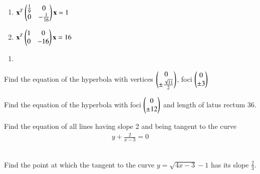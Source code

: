 \begin{enumerate}
\item 
$
\mathbf{x}^T\begin{pmatrix}\frac{1}{9} & 0 \\ 0 & -\frac{1}{16}\end{pmatrix}\mathbf{x} = 1
$
\item 
$
\mathbf{x}^T\begin{pmatrix}1 & 0 \\ 0 & -16\end{pmatrix}\mathbf{x} = 16
$
\end{enumerate}
\solution
\begin{enumerate}
    \item 
    

\end{enumerate}

\item Find the equation of the hyperbola with  vertices $\begin{pmatrix}0 \\ \pm \frac{\sqrt{11}}{2}\end{pmatrix}$, foci $\begin{pmatrix} 0\\ \pm 3\end{pmatrix}$
\item Find the equation of the hyperbola with   foci $\begin{pmatrix} 0\\ \pm 12\end{pmatrix}$ and length of latus rectum 36.
%
\item Find the equation of all lines having slope 2 and being tangent to the curve
\begin{align}
y + \frac{2}{x-3} = 0
\end{align}
%
\\
\solution



\item Find the point at which the tangent to the curve $y = \sqrt{4x-3}-1$ has its 
slope $\frac{2}{3}$.
%
\\
\solution


